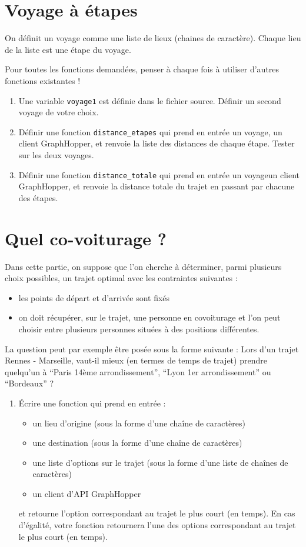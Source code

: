 \documentclass[11pt,a4paper]{article}
\begin{document}
\section{Voyage à étapes}
On définit un voyage comme une liste de lieux (chaines de caractère). Chaque lieu de la liste est une étape du voyage.

Pour toutes les fonctions demandées, penser à chaque fois à utiliser d'autres fonctions existantes !

\begin{enumerate}
    \item Une variable \verb+voyage1+ est définie dans le fichier source. Définir un second voyage de votre choix.
    \item Définir une fonction \verb+distance_etapes+ qui prend en entrée un voyage, un client GraphHopper, et renvoie la liste des distances de chaque étape. Tester sur les deux voyages.
    \item Définir une fonction \verb+distance_totale+ qui prend en entrée un voyageun client GraphHopper, et renvoie la distance totale du trajet en passant par chacune des étapes.
\end{enumerate}

\section{Quel co-voiturage ?}

Dans cette partie, on suppose que l’on cherche à déterminer, parmi plusieurs choix possibles, un trajet optimal avec les contraintes suivantes :
\begin{itemize}
    \item les points de départ et d’arrivée sont fixés
    \item on doit récupérer, sur le trajet, une personne en covoiturage et l’on peut choisir entre plusieurs personnes situées à des positions différentes.
\end{itemize}

La question peut par exemple être posée sous la forme suivante : \og 
    Lors d’un trajet Rennes - Marseille, vaut-il mieux (en termes de temps de trajet) prendre quelqu’un à “Paris 14ème arrondissement”, “Lyon 1er arrondissement” ou “Bordeaux” ? \fg

\begin{enumerate}
    \item Écrire une fonction qui prend en entrée :
    \begin{itemize}
        \item un lieu d’origine (sous la forme d’une chaîne de caractères)
        \item une destination (sous la forme d’une chaîne de caractères)
        \item une liste d’options sur le trajet (sous la forme d’une liste de chaînes de caractères)
        \item un client d’API GraphHopper
    \end{itemize}
    et retourne l’option correspondant au trajet le plus court (en temps). En cas d’égalité, votre fonction retournera l’une des options correspondant au trajet le plus court (en temps).

\end{enumerate}
\end{document}
